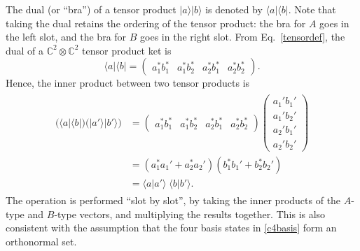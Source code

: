 \documentclass[pra,12pt]{revtex4-2}
\begin{document}
The dual (or ``bra'') of a tensor product $|a\rangle |b\rangle$ is
denoted by $\langle a| \langle b|$.  Note that taking the dual retains
the ordering of the tensor product: the bra for $A$ goes in the left
slot, and the bra for $B$ goes in the right slot.  From
Eq.~\eqref{tensordef}, the dual of a $\mathbb{C}^2\otimes\mathbb{C}^2$
tensor product ket is
\begin{equation}
  \langle a| \langle b| =
  \begin{pmatrix} a_1^* b_1^* & a_1^* b_2^*
    & a_2^* b_1^* & a_2^* b_2^* \end{pmatrix}.
\end{equation}
Hence, the inner product between two tensor products is
\begin{align}
  \begin{aligned}
  \Big(\langle a| \langle b|\Big)
  \Big(|a'\rangle |b'\rangle\Big)
  &= \begin{pmatrix} a_1^* b_1^* & a_1^* b_2^*
    & a_2^* b_1^* & a_2^* b_2^* \end{pmatrix}
  \begin{pmatrix} a_1' b_1' \\ a_1' b_2' \\
    a_2' b_1' \\ a_2' b_2' \end{pmatrix} \\
  &= (a_1^*a_1' + a_2^*a_2') (b_1^*b_1' + b_2^*b_2') \\
  &= \langle a|a'\rangle \; \langle b|b'\rangle.  
  \end{aligned}
  \label{inprodex}
\end{align}
The operation is performed ``slot by slot'', by taking the inner
products of the $A$-type and $B$-type vectors, and multiplying the
results together.  This is also consistent with the assumption that
the four basis states in \eqref{c4basis} form an orthonormal set.
\end{document}
